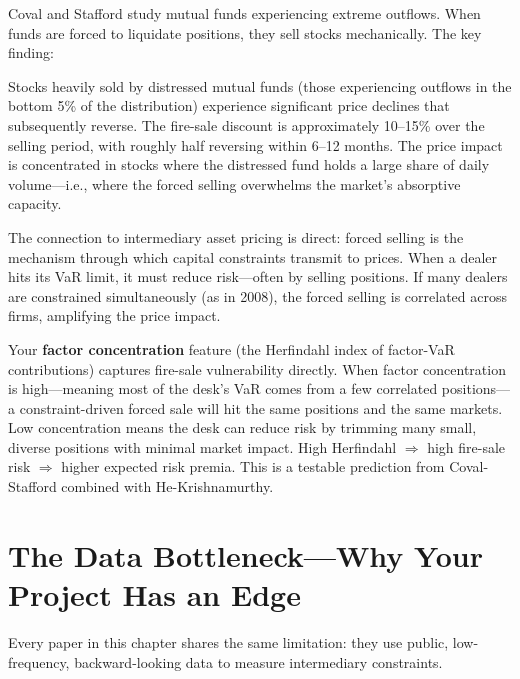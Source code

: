 Coval and Stafford study mutual funds experiencing extreme outflows. When funds are forced to liquidate positions, they sell stocks mechanically. The key finding:

\begin{keyresult}
Stocks heavily sold by distressed mutual funds (those experiencing outflows in the bottom 5\% of the distribution) experience significant price declines that subsequently reverse. The fire-sale discount is approximately 10--15\% over the selling period, with roughly half reversing within 6--12 months. The price impact is concentrated in stocks where the distressed fund holds a large share of daily volume---i.e., where the forced selling overwhelms the market's absorptive capacity.
\end{keyresult}

The connection to intermediary asset pricing is direct: forced selling is the mechanism through which capital constraints transmit to prices. When a dealer hits its VaR limit, it must reduce risk---often by selling positions. If many dealers are constrained simultaneously (as in 2008), the forced selling is correlated across firms, amplifying the price impact.

\begin{projectconnection}
Your \textbf{factor concentration} feature (the Herfindahl index of factor-VaR contributions) captures fire-sale vulnerability directly. When factor concentration is high---meaning most of the desk's VaR comes from a few correlated positions---a constraint-driven forced sale will hit the same positions and the same markets. Low concentration means the desk can reduce risk by trimming many small, diverse positions with minimal market impact. High Herfindahl $\Rightarrow$ high fire-sale risk $\Rightarrow$ higher expected risk premia. This is a testable prediction from Coval-Stafford combined with He-Krishnamurthy.
\end{projectconnection}

\section{The Data Bottleneck---Why Your Project Has an Edge}
\label{sec:data-bottleneck}

Every paper in this chapter shares the same limitation: they use public, low-frequency, backward-looking data to measure intermediary constraints.

